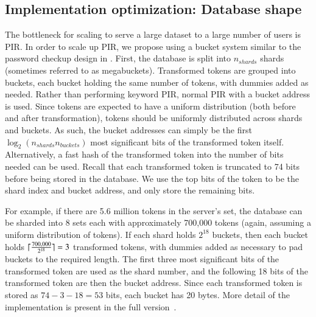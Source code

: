 \subsection{Implementation optimization: Database shape}
\label{subs:impl_optz}
The bottleneck for scaling \psica to serve a large dataset to a large number of users is PIR. In order to scale up PIR, we propose using a bucket system similar to the password checkup design in \cite{EPRINT:ALPRSSY19}. First, the database is split into $n_{shards}$ shards (sometimes referred to as megabuckets). Transformed tokens are grouped into buckets, each bucket holding the same number of tokens, with dummies added as needed. Rather than performing keyword PIR, normal PIR with a bucket address is used. Since tokens are expected to have a uniform distribution (both before and after transformation), tokens should be uniformly distributed across shards and buckets. As such, the bucket addresses can simply be the first $\log_2(n_{shards} n_{buckets})$ most significant bits of the transformed token itself. Alternatively, a fast hash of the transformed token into the number of bits needed can be used. Recall that each transformed token is truncated to 74 bits before being stored in the database. We use the top bits of the token to be the shard index and bucket address, and only store the remaining bits. 


 For example, if there are 5.6 million tokens in the server's set, the database can be sharded into 8 sets each with approximately 700,000 tokens (again, assuming a uniform distribution of tokens). If each shard holds $2^{18}$ buckets, then each bucket holds ${\lceil{\frac{700,000}{2^{18}}}\rceil} = 3$ transformed tokens, with dummies added as necessary to pad buckets to the required length. The first three most significant bits of the transformed token are used as the shard number, and the following 18 bits of the transformed token are then the bucket address.  Since each transformed token is stored as $74 - 3 - 18 = 53$ bits, each bucket has 20 bytes.  More detail of the implementation is present in the full version~\cite{epione}.
 
